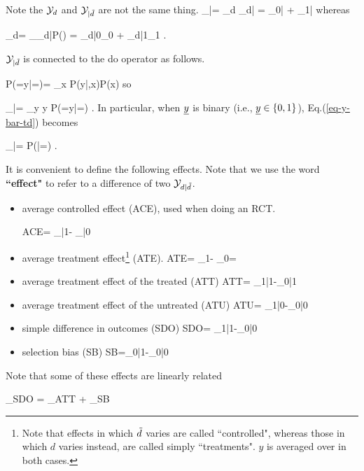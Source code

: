 Note the 
 ${\cal Y}_d$ and ${\cal Y}_{|{\tilde{d}}}$
are not the same thing.
\beq
\caly_{|\td}=
\sum_d \caly_{d|\td}
=
\caly_{0|\td} +
 \caly_{1|\td}
\eeq
whereas

\beq
\caly_d=
\sum_\td \caly_{d|\td}P(\td)
= \caly_{d|0}\pi_0
+
\caly_{d|1}\pi_{1}
\;.
\eeq


${\cal Y}_{|{\tilde{d}}}$
is connected to the do operator as follows.

\beq
P(\rvy=y|\rho \rvd=\td)=
\sum_x P(y|\td,x)P(x)
\eeq
so

\beq
\caly_{|\td}=
\sum_y y P(\rvy=y|\rho \rvd=\td)
\;.
\label{eq-y-bar-td}
\eeq
In particular, when
${\underline{y}}$ is binary 
(i.e.,  ${\underline{y}}\in\{0,1\}$), 
Eq.(\ref{eq-y-bar-td}) becomes

\beq
\caly_{|\td}=
P(|\rho\rvd=\td)
\;.
\eeq

It is convenient to
define the following effects. Note
that we use  the
word {\bf ``effect"} to
refer to 
a difference of two  ${\cal Y}_{d|{\tilde{d}}}$.

\begin{itemize}

\item average controlled effect  
 (ACE), used when doing an RCT.

\beq
{\color{red}ACE}=
\caly_{|1}-
\caly_{|0}
\eeq

\item average treatment effect\footnote{
Note that effects in which ${\tilde{d}}$ varies
are called
``controlled",
whereas those in which $d$ varies instead,
 are called simply ``treatments".
$y$ is averaged over
in both cases.}
 (ATE).
\beq
{\color{red}ATE}=
\caly_{1}-
\caly_{0}= \delta
\eeq

\item average treatment effect 
of the treated (ATT)
\beq
{\color{red}ATT}=
\caly_{1|1}-\caly_{0|1}
\eeq

\item average
treatment effect of the untreated (ATU)
\beq
{\color{red}ATU}=
\caly_{1|0}-\caly_{0|0}
\eeq

\item simple difference in outcomes (SDO)
\beq
{\color{red} SDO}= \caly_{1|1}-\caly_{0|0}
\eeq

\item selection bias (SB)
\beq
{\color{red}SB}=\caly_{0|1}-\caly_{0|0}
\eeq
\end{itemize}

Note that some
of these effects  are
linearly related

\beq
{}_{SDO}
=
_{ATT}
+
_{SB}
\eeq

